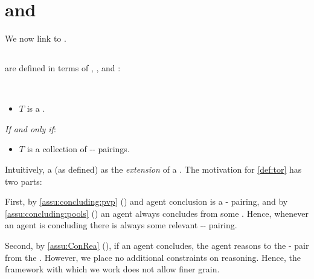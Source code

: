 \section{ and }
\label{cha:typical:tCDef}


\begin{note}
  We now link \tCV{} to .
\end{note}



\subsection{}
\label{cha:typical:tCDef:ToRdef}

\begin{note}
   are defined in terms of , , and :

  \begin{definition}[A \torN{0}]
    \label{def:tor}
    \mbox{ }
    \vspace{-\baselineskip}
    \begin{itemize}
    \item
      \(T\) is a \torN{}.
    \end{itemize}

    \emph{If and only if}:

    \begin{itemize}
    \item
      \(T\) is a collection of -- pairings.
    \end{itemize}
    \vspace{-\baselineskip}
  \end{definition}

  \noindent%
  Intuitively, a \torN{} (as defined) as the \emph{extension} of a \torN{}.
  The motivation for \autoref{def:tor} has two parts:

  First, by \autoref{assu:concluding:pvp} () and agent conclusion is a - pairing, and by \autoref{assu:concluding:pools} () an agent always concludes from some \pool{}.
  Hence, whenever an agent is concluding there is always some relevant -- pairing.

  Second, by \autoref{assu:ConRea} (), if an agent concludes, the agent reasons to the - pair from the .
  However, we place no additional constraints on reasoning.
  Hence, the framework with which we work does not allow finer grain.
\end{note}

